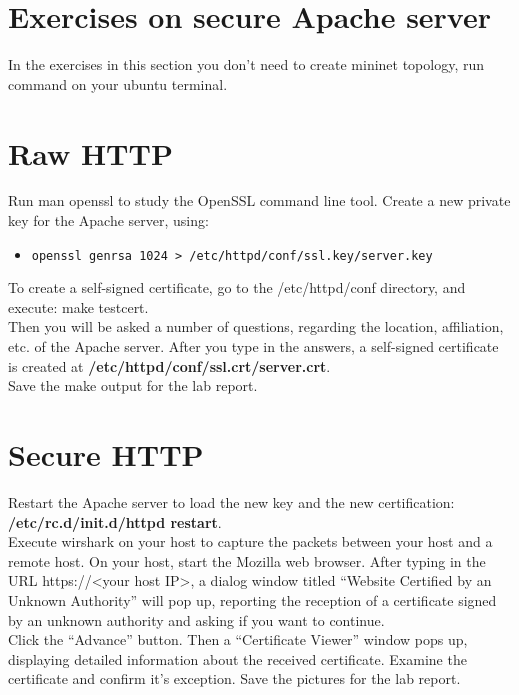 \documentclass[10pt,a4paper]{article}
\numberwithin{equation}{section}
\numberwithin{figure}{section}
\numberwithin{table}{section}
\begin{document}
\section*{Exercises on secure Apache server}
In the exercises in this section you don't need to create mininet topology, run command on your ubuntu terminal.
\section{Raw HTTP}
Run man openssl to study the OpenSSL command line tool.
Create a new private key for the Apache server, using:

\begin{itemize}
	\setlength{\itemindent}{10pt}
	\item [] \texttt{openssl genrsa 1024 > /etc/httpd/conf/ssl.key/server.key} 
\end{itemize}

To create a self-signed certificate, go to the /etc/httpd/conf directory, and execute: make testcert. \\

Then you will be asked a number of questions, regarding the location, affiliation, etc. of the Apache server. After you type in the answers, a self-signed certificate is created at \textbf{/etc/httpd/conf/ssl.crt/server.crt}. \\

Save the make output for the lab report.

\section{Secure HTTP}
Restart the Apache server to load the new key and the new certification: \textbf{/etc/rc.d/init.d/httpd restart}.\\

Execute wirshark on your host  to capture the packets between your host and a remote host. On your host, start the Mozilla web browser. After typing in the URL https://<your host IP>, a dialog window titled “Website Certified by an Unknown Authority” will pop up, reporting the reception of a certificate signed by an unknown authority and asking if you want to continue. \\

Click the “Advance” button. Then a “Certificate Viewer” window pops up, displaying detailed information about the received certificate. Examine the certificate and confirm it's exception. Save the pictures for the lab report. \\
\end{document}
